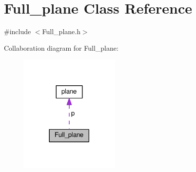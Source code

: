 \hypertarget{class_full__plane}{}\section{Full\+\_\+plane Class Reference}
\label{class_full__plane}


{\ttfamily \#include $<$Full\+\_\+plane.\+h$>$}



Collaboration diagram for Full\+\_\+plane\+:
\nopagebreak
\begin{figure}[H]
\begin{center}
\leavevmode
\includegraphics[width=141pt]{class_full__plane__coll__graph}
\end{center}
\end{figure}
